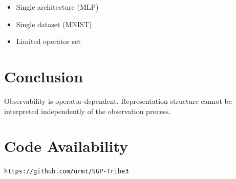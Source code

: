 \documentclass[11pt]{article}
\begin{document}
\begin{itemize}
	\item Single architecture (MLP)
	\item Single dataset (MNIST)
	\item Limited operator set
\end{itemize}

\section{Conclusion}

Observability is operator-dependent. Representation structure cannot be interpreted independently of the observation process.

\section*{Code Availability}

\texttt{https://github.com/urmt/SGP-Tribe3}



\end{document}
